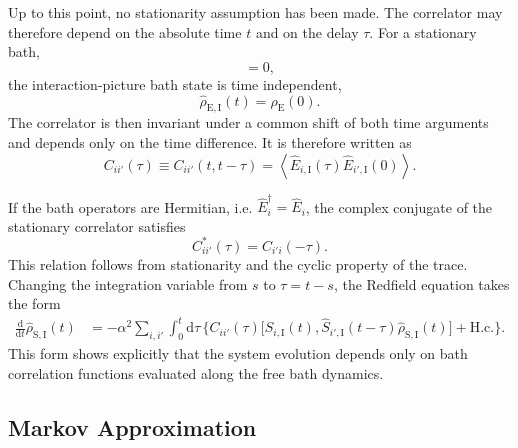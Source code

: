 Up to this point, no stationarity assumption has been made. The correlator may therefore depend on the absolute time \(t\) and on the delay \(\tau\). For a stationary bath,
\begin{equation*}
	[\hat{H}_{\mathrm{E}},\hat{\rho}_{\mathrm{E}}(0)]=0,
\end{equation*}
the interaction-picture bath state is time independent,
\begin{equation*}
	\hat{\rho}_{\mathrm{E},\mathrm{I}}(t)
	=
	\hat{\rho}_{\mathrm{E}}(0).
\end{equation*}
The correlator is then invariant under a common shift of both time arguments and depends only on the time difference. It is therefore written as
\begin{equation*}
	C_{ii'}(\tau)
	\equiv
	C_{ii'}(t,t-\tau)
	=
	\left\langle
	\hat{E}_{i,\mathrm{I}}(\tau)
	\hat{E}_{i',\mathrm{I}}(0)
	\right\rangle .
\end{equation*}

If the bath operators are Hermitian, i.e. \(\hat{E}_i^\dagger=\hat{E}_i\), the complex conjugate of the stationary correlator satisfies
\begin{equation*}
	C_{ii'}^{*}(\tau)
	=
	C_{i'i}(-\tau).
\end{equation*}
This relation follows from stationarity and the cyclic property of the trace. Changing the integration variable from \(s\) to \(\tau=t-s\), the Redfield equation takes the form
\begin{align}
	\frac{\mathrm{d}}{\mathrm{d}t}\hat{\rho}_{\mathrm{S},\mathrm{I}}(t)
	&=
	-\alpha^2
	\sum_{i,i'}
	\int_0^t\!\mathrm{d}\tau\,
	\bigg\{
	C_{ii'}(\tau)
	\big[
	\hat{S}_{i,\mathrm{I}}(t),
	\hat{S}_{i',\mathrm{I}}(t-\tau)
	\hat{\rho}_{\mathrm{S},\mathrm{I}}(t)
	\big]
	+
	\mathrm{H.c.}
	\bigg\}.
	\label{eq:oqs_Redfield_Equation_PreMarkov}
\end{align}
This form shows explicitly that the system evolution depends only on bath correlation functions evaluated along the free bath dynamics.

\subsection{Markov Approximation}
\label{subsec:oqs_markov_approximation}

